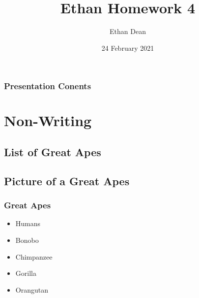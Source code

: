 \documentclass[12pt]{beamer}\usepackage[]{graphicx}\usepackage[]{color}
\title[Short title]{Ethan Homework 4} %
\author{Ethan Dean} %
\institute[UVM] %
{
University of Vermont \\ %
Department of Biology \\
Burlington, VT 05401 USA \\ 
\medskip
\textit{emdean@uvm.edu} %
}
\date{24 February 2021} %
\begin{document}
\begin{frame}
\titlepage %
\end{frame}


\begin{frame}
\frametitle{Presentation Conents} %
\tableofcontents %
\end{frame}

\section{Non-Writing} %

\subsection{List of Great Apes}
\subsection{Picture of a Great Apes}

\begin{frame}
\frametitle{Great Apes}
\begin{itemize}
\item Humans
\item Bonobo
\item Chimpanzee
\item Gorilla
\item Orangutan
\end{itemize}
\end{frame}
\end{document}
